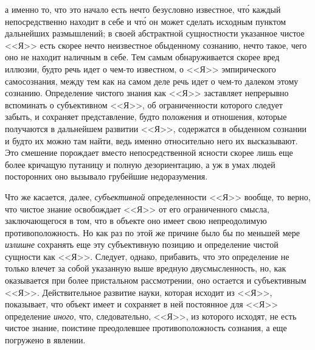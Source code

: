а именно то, что это начало есть нечто безусловно
известное, чт\'о каждый непосредственно находит
в себе и чт\'о он может сделать исходным пунктом дальнейших
размышлений; в своей абстрактной сущностности
указанное чистое <<Я>> есть скорее нечто неизвестное
обыденному сознанию, нечто такое, чего оно не находит
наличным в себе. Тем самым обнаруживается скорее
вред иллюзии, будто речь идет о чем-то известном, о <<Я>>
эмпирического самосознания, между тем как на самом
деле речь идет о чем-то далеком этому сознанию. Определение
чистого знания как <<Я>> заставляет непрерывно
вспоминать о субъективном <<Я>>, об ограниченности которого
следует забыть, и сохраняет представление, будто
положения и отношения, которые получаются в дальнейшем
развитии <<Я>>, содержатся в обыденном сознании
и будто их можно там найти, ведь именно относительно
него их высказывают. Это смешение порождает
вместо непосредственной ясности скорее лишь еще более
кричащую путаницу и полную дезориентацию, а уж
в умах людей посторонних оно вызывало грубейшие недоразумения.


Что же касается, далее, \emph{субъективной} определенности
<<Я>> вообще, то верно, что чистое знание освобождает
<<Я>> от его ограниченного смысла, заключающегося в том,
что в объекте оно имеет свою непреодолимую противоположность.
Но как раз по этой же причине было бы по
меньшей мере \emph{излишне} сохранять еще эту субъективную
позицию и определение чистой сущности как <<Я>>. Следует,
однако, прибавить, что это определение не только
влечет за собой указанную выше вредную двусмысленность,
но, как оказывается при более пристальном рассмотрении,
оно остается и субъективным <<Я>>. Действительное
развитие науки, которая исходит из <<Я>>, показывает,
что объект имеет и сохраняет в ней постоянное
для <<Я>> определение \emph{иного}, что, следовательно, <<Я>>, из
которого исходят, не есть чистое знание, поистине преодолевшее
противоположность сознания, а еще погружено
в явлении.

